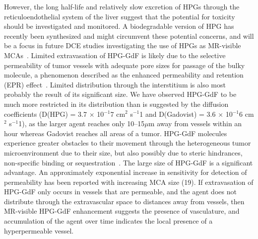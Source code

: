 However, the long half-life and relatively slow excretion of HPGs through the reticuloendothelial system of the liver suggest that the potential for toxicity should be investigated and monitored.
A biodegradable version of HPG has recently been synthesized and might circumvent these potential concerns, and will be a focus in future DCE studies investigating the use of HPGs as MR-visible MCAs~\cite{Shenoi:2013id}.
Limited extravasation of HPG-GdF is likely due to the selective permeability of tumor vessels with adequate pore sizes for passage of the bulky molecule, a phenomenon described as the enhanced permeability and retention (EPR) effect~\cite{Maeda:2013hq}.
Limited distribution through the interstitium is also most probably the result of its significant size.
We have observed HPG-GdF to be much more restricted in its distribution than is suggested by the diffusion coefficients (D(HPG) = 3.7 × 10$^{-1}$7 cm$^2$ s$^{-1}$1 and D(Gadovist) = 3.6 × 10$^{-1}$6 cm$^2$ s$^{-1}$1), as the larger agent reaches only 10–15$\mu$m away from vessels within an hour whereas Gadovist reaches all areas of a tumor.
HPG-GdF molecules experience greater obstacles to their movement through the heterogeneous tumor microenvironment due to their size, but also possibly due to steric hindrances, non-specific binding or sequestration~\cite{Minchinton:2006gs}.
The large size of HPG-GdF is a significant advantage.
An approximately exponential increase in sensitivity for detection of permeability has been reported with increasing MCA size (19).
If extravasation of HPG-GdF only occurs in vessels that are permeable, and the agent does not distribute through the extravascular space to distances away from vessels, then MR-visible HPG-GdF enhancement suggests the presence of vasculature, and accumulation of the agent over time indicates the local presence of a hyperpermeable vessel.

